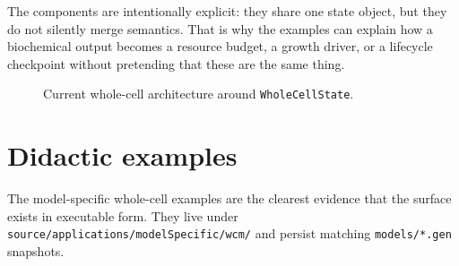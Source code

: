The components are intentionally explicit: they share one state object, but they
do not silently merge semantics. That is why the examples can explain how a
biochemical output becomes a resource budget, a growth driver, or a lifecycle
checkpoint without pretending that these are the same thing.

\begin{figure}[htbp]
\centering
\caption{Current whole-cell architecture around \texttt{WholeCellState}.}
\label{fig:whole-cell-architecture}
\end{figure}

\section{Didactic examples}

The model-specific whole-cell examples are the clearest evidence that the
surface exists in executable form. They live under
\texttt{source/applications/modelSpecific/wcm/} and persist matching
\texttt{models/*.gen} snapshots.

